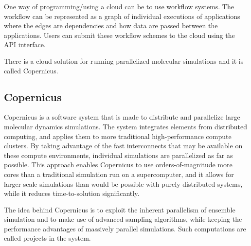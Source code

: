 
One way of programming/using a cloud can be to use workflow
systems. The workflow can be represented as a graph of individual
executions of applications where the edges are dependencies and how
data are passed between the applications. Users can submit these
workflow schemes to the cloud using the API interface.







There is a cloud solution for running parallelized molecular
simulations and it is called Copernicus.


\subsection{Copernicus}
Copernicus is a software system that is made to distribute and
parallelize large molecular dynamics simulations. The system
integrates elements from distributed computing, and applies them to
more traditional high-performance compute clusters. By taking
advantage of the fast interconnects that may be available on these
compute environments, individual simulations are parallelized as far
as possible. This approach enables Copernicus to use
orders-of-magnitude more cores than a traditional simulation run on a
supercomputer, and it allows for larger-scale simulations than would
be possible with purely distributed systems, while it reduces
time-to-solution significantly.

The idea behind Copernicus is to exploit the inherent parallelism of
ensemble simulation and to make use of advanced sampling algorithms,
while keeping the performance advantages of massively parallel
simulations. Such computations are called projects in the system.

